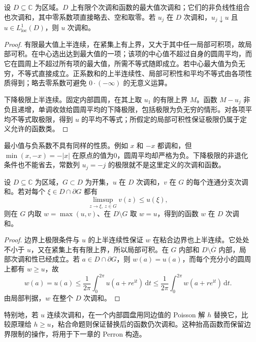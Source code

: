 \begin{proposition}\label{b3:prop:15-subharmonic-operations}
设 \(D\subseteq\mathbb C\) 为区域。\(D\) 上有限个次调和函数的最大值次调和；它们的非负线性组合也次调和，其中零系数项直接略去、空和取零。若 \(u_j\) 在 \(D\) 次调和，\(u_j\downarrow u\) 且 \(u\in L^1_{\mathrm{loc}}(D)\)，则 \(u\) 次调和。
\end{proposition}
\begin{proof}
有限最大值上半连续，在紧集上有上界，又大于其中任一局部可积项，故局部可积。在中心选出达到最大值的一项；该项的中心值不超过自身的圆周平均，而它在圆周上不超过所有项的最大值，所需不等式随即成立。若中心最大值为负无穷，不等式直接成立。正系数和的上半连续性、局部可积性和平均不等式由各项性质得到；略去零系数可避免 \(0\cdot(-\infty)\) 的无意义运算。

下降极限上半连续。固定内部圆周，在其上取 \(u_1\) 的有限上界 \(M\)。函数 \(M-u_j\) 非负且递增，单调收敛给圆周平均的下降极限，包括极限为负无穷的情形。对各项平均不等式取极限，得到 \(u\) 的平均不等式；所假定的局部可积性保证极限仍属于定义允许的函数类。
\end{proof}
最小值与负系数不具有同样的性质。例如 \(x\) 和 \(-x\) 都调和，但 \(\min(x,-x)=-|x|\) 在原点的值为0，圆周平均却严格为负。下降极限的非退化条件也不能省去，常数列 \(u_j=-j\) 的极限就不是这里定义的次调和函数。

\begin{proposition}[次调和函数的粘合]\label{b3:prop:15-pasting}
设 \(D\subseteq\mathbb C\) 为区域，\(G\subset D\) 为开集，\(u\) 在 \(D\) 次调和，\(v\) 在 \(G\) 的每个连通分支次调和。若对每个 \(\xi\in D\cap\partial G\) 都有
\[
 \limsup_{z\to\xi,\ z\in G}v(z)\le u(\xi),
\]
则在 \(G\) 内取 \(w=\max(u,v)\)、在 \(D\setminus G\) 取 \(w=u\)，得到的函数 \(w\) 在 \(D\) 次调和。
\end{proposition}
\begin{proof}
边界上极限条件与 \(u\) 的上半连续性保证 \(w\) 在粘合边界也上半连续。它处处不小于 \(u\)，又在紧集上有有限上界，所以局部可积。在 \(G\) 内部和 \(D\setminus\overline G\) 内部，局部次调和性已经成立。若 \(a\in D\cap\partial G\)，则 \(w(a)=u(a)\)，而每个充分小的圆周上都有 \(w\ge u\)，故
\[
 w(a)=u(a)\le\frac1{2\pi}\int_0^{2\pi}u(a+re^{\mathrm{i}t})\,\mathrm{d}t
 \le\frac1{2\pi}\int_0^{2\pi}w(a+re^{\mathrm{i}t})\,\mathrm{d}t.
\]
由局部判据，\(w\) 在整个 \(D\) 次调和。
\end{proof}
特别地，若 \(u\) 连续次调和，在一个内部圆盘用同边值的 Poisson 解 \(h\) 替换它，比较原理给 \(h\ge u\)，粘合命题则保证替换后的函数仍次调和。这种抬高函数而保留边界限制的操作，将用于下一章的 Perron 构造。

